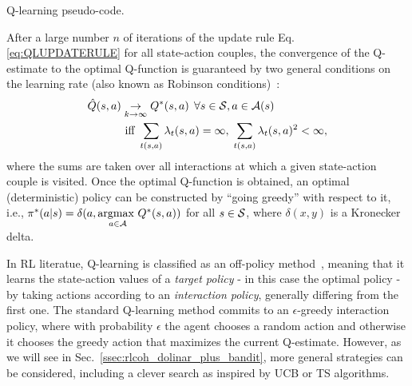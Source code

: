 \begin{algorithm}[h]\label{alg:ql}
  \DontPrintSemicolon
  \SetAlgoNoEnd
  \Input{$\hat{Q}(s,a)$ \texttt{arbitrarly initialized} $\forall s \in \cS, \; \forall a \in \cA (s)$; \texttt{learning rates} $\lambda_t(s_\ell,a_\ell) \in (0, 1]$, $\epsilon > 0$}
  \;
\caption{Q-learning pseudo-code.}
\end{algorithm}

After a large number $n$ of iterations of the update rule Eq. \eqref{eq:QLUPDATERULE} for all state-action couples, the convergence of the Q-estimate to the optimal Q-function is guaranteed by two general conditions on the learning rate (also known as Robinson conditions)~\cite{Watkins1989,Sutton2018}:
\begin{align}\label{eq:qLConv}
\hat{Q}(s,a)&\underset{k\rightarrow\infty}{\rightarrow}Q^{*}(s,a)\;\,\forall s\in\mathcal{S}, a\in\mathcal{A}(s)\\
&\text{ iff }\sum_{t(s,a)}\lambda_{t}(s,a)=\infty,\;\sum_{t(s,a)}\lambda_{t}(s,a)^{2}<\infty,
\end{align}
where the sums are taken over all interactions at which a given state-action couple is visited.
Once the optimal Q-function is obtained, an optimal (deterministic) policy can be constructed by ``going greedy'' with respect to it, i.e., $\pi^{*}(a|s) = \delta(a,\underset{a\in\mathcal{A}}{\text{argmax }} Q^{*}(s,a))$ for all $s\in\mathcal{S}$, where $\delta(x,y)$ is a Kronecker delta.

In RL literatue, Q-learning is classified as an off-policy method~\cite{Sutton2018}, meaning that it learns the state-action values of a \textit{target policy} - in this case the optimal policy - by taking actions according to an \textit{interaction policy}, generally differing from the first one. The standard Q-learning method commits to an $\epsilon$-greedy interaction policy, where with probability $\epsilon$ the agent chooses a random action and otherwise it chooses the greedy action that maximizes the current Q-estimate. However, as we will see in Sec.~\ref{ssec:rlcoh_dolinar_plus_bandit}, more general strategies can be considered, including a clever search as inspired by UCB or TS algorithms.%

